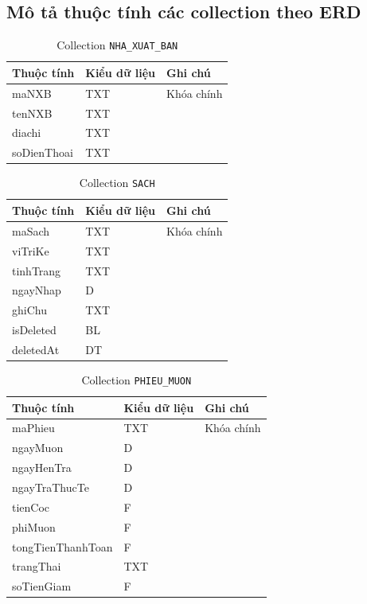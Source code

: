 \documentclass[../main.tex]{subfiles}
\begin{document}
\subsection{Mô tả thuộc tính các collection theo ERD}

\begingroup
\footnotesize
\begin{longtable}{|p{5.7cm}|p{2.4cm}|p{5.2cm}|}
\caption{Collection \texttt{NHA\_XUAT\_BAN}}\\
\hline
\textbf{Thuộc tính} & \textbf{Kiểu dữ liệu} & \textbf{Ghi chú} \\
\hline
maNXB & TXT & Khóa chính \\
\hline
tenNXB & TXT &  \\
\hline
diachi & TXT &  \\
\hline
soDienThoai & TXT &  \\
\hline
\end{longtable}

\begin{longtable}{|p{5.7cm}|p{2.4cm}|p{5.2cm}|}
\caption{Collection \texttt{SACH}}\\
\hline
\textbf{Thuộc tính} & \textbf{Kiểu dữ liệu} & \textbf{Ghi chú} \\
\hline
maSach & TXT & Khóa chính \\
\hline
viTriKe & TXT &  \\
\hline
tinhTrang & TXT &  \\
\hline
ngayNhap & D &  \\
\hline
ghiChu & TXT &  \\
\hline
isDeleted & BL &  \\
\hline
deletedAt & DT &  \\
\hline
\end{longtable}

\begin{longtable}{|p{5.7cm}|p{2.4cm}|p{5.2cm}|}
\caption{Collection \texttt{PHIEU\_MUON}}\\
\hline
\textbf{Thuộc tính} & \textbf{Kiểu dữ liệu} & \textbf{Ghi chú} \\
\hline
maPhieu & TXT & Khóa chính \\
\hline
ngayMuon & D &  \\
\hline
ngayHenTra & D &  \\
\hline
ngayTraThucTe & D &  \\
\hline
tienCoc & F &  \\
\hline
phiMuon & F &  \\
\hline
tongTienThanhToan & F &  \\
\hline
trangThai & TXT &  \\
\hline
soTienGiam & F &  \\
\hline
\end{longtable}
\end{document}
